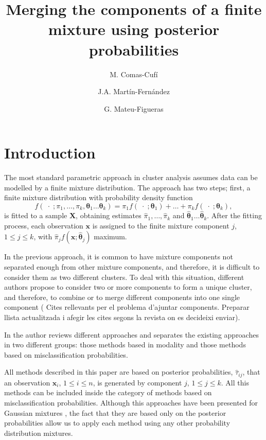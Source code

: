 \documentclass[10pt, a4paper]{article}
\title{Merging the components of a finite mixture using  posterior probabilities}
\author{M. Comas-Cufí \and J.A. Martín-Fernández \and G. Mateu-Figueras}
\newcommand{\m}[1]{\boldsymbol{#1}}
\begin{document}
\maketitle

\section{Introduction}

The most standard parametric approach in cluster analysis assumes data can be modelled by a finite mixture distribution. The approach has two steps; first, a finite mixture distribution with probability density function
\[
f(\;\cdot\; ; \pi_1, \dots, \pi_k, \m\theta_1 \dots \m\theta_k) = \pi_1   f(\;\cdot\; ; \m\theta_1) + \dots + \pi_k f(\;\cdot\; ; \m\theta_k),
\]%
is fitted to a sample $\m X$, obtaining estimates $\hat{\pi}_1, \dots, \hat{\pi}_k$ and $\hat{\m\theta}_1 \dots \hat{\m\theta}_k$. After the fitting process, each observation $\m x$ is assigned to the finite mixture component $j$, $1\leq j \leq k$, with $\hat{\pi}_j f(\m x ; \hat{\m\theta}_j)$ maximum. 

In the previous approach, it is common to have mixture components not separated enough from other mixture components, and therefore, it is difficult to consider them as two different clusters. To deal with this situation, different authors propose to consider two or more components to form a unique cluster, and therefore, to combine or to merge different components into one single component ({\color{red} Cites rellevants per el problema d'ajuntar components. Preparar llista actualitzada i afegir les cites segons la revista on es decideixi enviar}).

In \cite{hennig2010methods} the author reviews different approaches and separates the existing approaches in two different groups: those methods based in modality and those methods based on misclassification probabilities.

All methods described in this paper are based on posterior probabilities, $\hat{\tau}_{ij}$, that an observation $\m x_i$, $1\leq i \leq n$, is generated by component $j$, $1\leq j\leq k$. All this methods can be included inside the category of methods based on misclassification probabilities. Although this approaches have been presented for Gaussian mixtures \citep{longford2014,melnykov2013distribution,hennig2010methods,baudry2010combining}, the fact that they are based only on the posterior probabilities allow us to apply each method using any other probability distribution mixtures.
\end{document}
